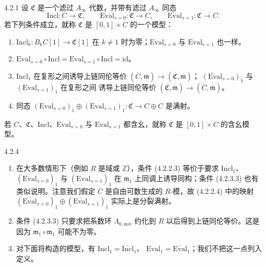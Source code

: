 \begin{definition}{4.2.1}
设 $\mathfrak C$ 是一个滤过 $A_\infty$ 代数，并带有滤过
$A_\infty$ 同态
\[
 \mathrm{Incl}\colon C\longrightarrow\mathfrak C,
 \qquad
 \mathrm{Eval}_{s=0}\colon\mathfrak C\longrightarrow C,
 \qquad
 \mathrm{Eval}_{s=1}\colon\mathfrak C\longrightarrow C.
\]
若下列条件成立，就称 $\mathfrak C$ 是 $[0,1]\times C$ 的一个模型：
\begin{enumerate}[label=\textup{(4.2.3.\arabic*)},leftmargin=5.4em]
 \item $\mathrm{Incl}_k\colon B_kC[1]\to\mathfrak C[1]$ 在
  $k\ne1$ 时为零；$\mathrm{Eval}_{s=0}$ 与
  $\mathrm{Eval}_{s=1}$ 也一样。
 \item $\mathrm{Eval}_{s=0}\circ\mathrm{Incl}=
  \mathrm{Eval}_{s=1}\circ\mathrm{Incl}=\mathrm{id}$。
 \item $\mathrm{Incl}_1$ 在复形之间诱导上链同伦等价
  $(\overline C,\overline{\mathfrak m})\to
  (\overline{\mathfrak C},\overline{\mathfrak m})$；
  $(\mathrm{Eval}_{s=0})_1$ 与 $(\mathrm{Eval}_{s=1})_1$ 在复形之间
  诱导上链同伦等价
  $(\overline{\mathfrak C},\overline{\mathfrak m})\to
  (\overline C,\overline{\mathfrak m})$。
 \item 同态
  $(\mathrm{Eval}_{s=0})_1\oplus(\mathrm{Eval}_{s=1})_1\colon
  \mathfrak C\to C\oplus C$ 是满射。
\end{enumerate}
若 $C$、$\mathfrak C$、$\mathrm{Incl}$、$\mathrm{Eval}_{s=0}$ 与
$\mathrm{Eval}_{s=1}$ 都含幺，就称 $\mathfrak C$ 是
$[0,1]\times C$ 的含幺模型。
\end{definition}

\begin{remark}{4.2.4}\label{rem:4-2-4}
\begin{enumerate}[label=\textup{(\arabic*)},leftmargin=2.8em]
 \item 在大多数情形下（例如 $R$ 是域或 $\mathbb Z$），条件
  (4.2.2.3) 等价于要求 $\overline{\mathrm{Incl}}_1$、
  $(\overline{\mathrm{Eval}}_{s=0})_1$ 与
  $(\overline{\mathrm{Eval}}_{s=1})_1$ 在
  $\overline{\mathfrak m}_1$ 上同调上诱导同构；条件 (4.2.3.3) 也有
  类似说明。注意我们假定 $\overline C$ 是自由可数生成的 $R$-模，故
  (4.2.2.4) 中的映射
  $(\overline{\mathrm{Eval}}_{s=0})_1\oplus
  (\overline{\mathrm{Eval}}_{s=1})_1$ 实际上是分裂满射。
 \item 条件 (4.2.3.3) 只要求把系数环
  $\Lambda_{0,\mathrm{nov}}$ 约化到 $R$ 以后得到上链同伦等价。这是因为
  $\mathfrak m_1\circ\mathfrak m_1$ 可能不为零。
 \item 对下面将构造的模型，有
  $\mathrm{Incl}_1=\overline{\mathrm{Incl}}_1$、
  $\mathrm{Eval}_1=\overline{\mathrm{Eval}}_1$；我们不把这一点列入定义。
\end{enumerate}
\end{remark}

